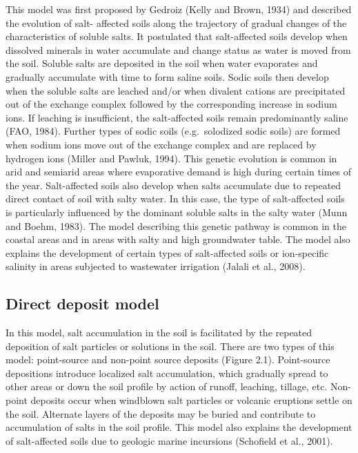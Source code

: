 \documentclass[
  10pt,
  b5paper,
]{book}
\begin{document}
This model was first proposed by Gedroiz (Kelly and Brown, 1934) and described the evolution of salt- affected soils along the trajectory of gradual changes of the characteristics of soluble salts. It postulated that salt-affected soils develop when dissolved minerals in water accumulate and change status as water is moved from the soil. Soluble salts are deposited in the soil when water evaporates and gradually accumulate with time to form saline soils. Sodic soils then develop when the soluble salts are leached and/or when divalent cations are precipitated out of the exchange complex followed by the corresponding increase in sodium ions. If leaching is insufficient, the salt-affected soils remain predominantly saline (FAO, 1984). Further types of sodic soils (e.g.~solodized sodic soils) are formed when sodium ions move out of the exchange complex and are replaced by hydrogen ions (Miller and Pawluk, 1994). This genetic evolution is common in arid and semiarid areas where evaporative demand is high during certain times of the year.
Salt-affected soils also develop when salts accumulate due to repeated direct contact of soil with salty water. In this case, the type of salt-affected soils is particularly influenced by the dominant soluble salts in the salty water (Munn and Boehm, 1983). The model describing this genetic pathway is common in the coastal areas and in areas with salty and high groundwater table. The model also explains the development of certain types of salt-affected soils or ion-specific salinity in areas subjected to wastewater irrigation (Jalali et al., 2008).

\hypertarget{direct-deposit-model}{%
\subsection{Direct deposit model}\label{direct-deposit-model}}

In this model, salt accumulation in the soil is facilitated by the repeated deposition of salt particles or solutions in the soil. There are two types of this model: point-source and non-point source deposits (Figure 2.1). Point-source depositions introduce localized salt accumulation, which gradually spread to other areas or down the soil profile by action of runoff, leaching, tillage, etc. Non-point deposits occur when windblown salt particles or volcanic eruptions settle on the soil. Alternate layers of the deposits may be buried and contribute to accumulation of salts in the soil profile. This model also explains the development of salt-affected soils due to geologic marine incursions (Schofield et al., 2001).
\end{document}
